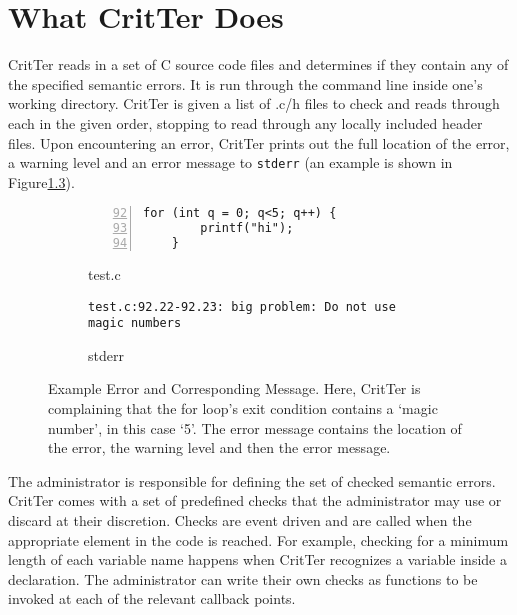 \documentclass[12pt]{report}
\def\lstlistingname{Figure}
\newcommand{\refCode}{\lstlistingname \hspace{1mm}}
\newcommand{\programName}{CritTer\xspace}
\begin{document}
\chapter{What \programName Does}

\programName reads in a set of C source code files and determines if they contain any of the 
specified semantic errors. It is run through the command line inside one's 
working directory. \programName is given a list of .c/h files to check and reads through each in the 
given order, stopping to read through any locally included header files. Upon encountering an error,
\programName prints out the full location of the error, a warning level and an error message to 
\lstinline{stderr} (an example is shown in \refCode \ref{errorExample}). 

\begin{figure}
\begin{subfigure}[b]{.5\linewidth}
\caption{test.c}
\label{errorExampleCode}
\begin{lstlisting}[numbers=left, firstnumber=92,xleftmargin=1cm]
	for (int q = 0; q<5; q++) {
		printf("hi");
	}
\end{lstlisting}
\end{subfigure}
\begin{subfigure}[b]{.5\linewidth}
\caption{stderr}
\label{errorExampleStderr}
\begin{lstlisting}[xleftmargin=1cm]
test.c:92.22-92.23: big problem: Do not use magic numbers
\end{lstlisting}
\end{subfigure}
\caption[Example Error and Corresponding Message]{Example Error and Corresponding Message. Here, \programName is complaining that the for loop's exit condition contains a `magic number', in this case `5'. The error message contains the location of the error, the warning level and then the error message.}
\label{errorExample}
\end{figure}

The administrator is responsible for defining the set of checked semantic errors. \programName 
comes with a set of predefined checks that the administrator may use or discard at their discretion. 
Checks are event driven and are called when the appropriate element in the code is reached. For 
example, checking for a minimum length of each variable name happens when \programName 
recognizes a variable inside a declaration. The administrator can write their own checks as functions 
to be invoked at each of the relevant callback points.
\end{document}
